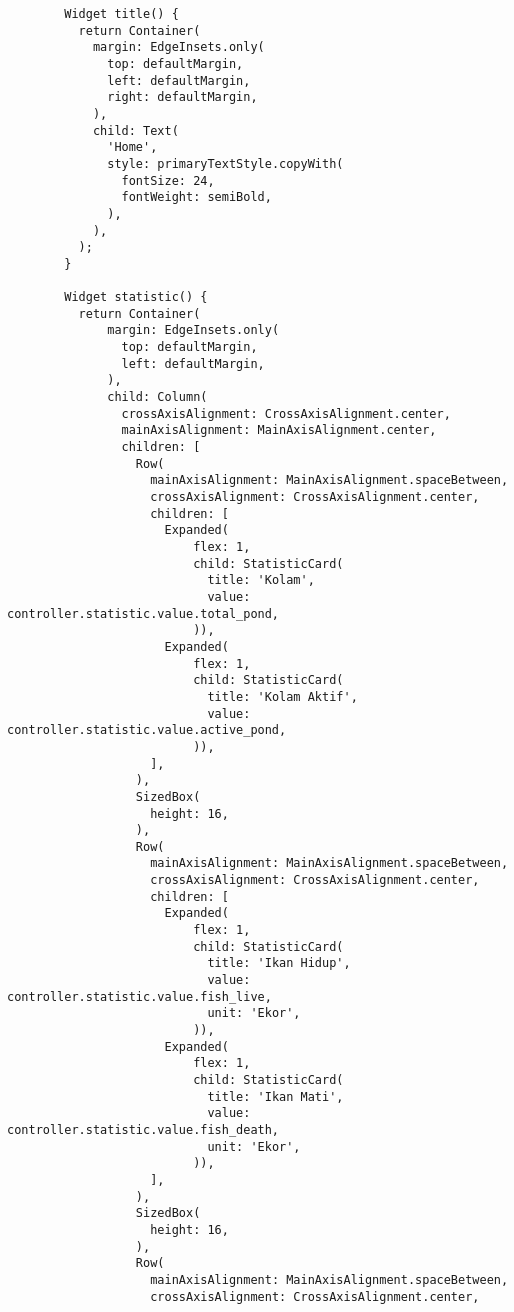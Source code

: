 	\begin{lstlisting}
	    Widget title() {
	      return Container(
	        margin: EdgeInsets.only(
	          top: defaultMargin,
	          left: defaultMargin,
	          right: defaultMargin,
	        ),
	        child: Text(
	          'Home',
	          style: primaryTextStyle.copyWith(
	            fontSize: 24,
	            fontWeight: semiBold,
	          ),
	        ),
	      );
	    }
	
	    Widget statistic() {
	      return Container(
	          margin: EdgeInsets.only(
	            top: defaultMargin,
	            left: defaultMargin,
	          ),
	          child: Column(
	            crossAxisAlignment: CrossAxisAlignment.center,
	            mainAxisAlignment: MainAxisAlignment.center,
	            children: [
	              Row(
	                mainAxisAlignment: MainAxisAlignment.spaceBetween,
	                crossAxisAlignment: CrossAxisAlignment.center,
	                children: [
	                  Expanded(
	                      flex: 1,
	                      child: StatisticCard(
	                        title: 'Kolam',
	                        value: controller.statistic.value.total_pond,
	                      )),
	                  Expanded(
	                      flex: 1,
	                      child: StatisticCard(
	                        title: 'Kolam Aktif',
	                        value: controller.statistic.value.active_pond,
	                      )),
	                ],
	              ),
	              SizedBox(
	                height: 16,
	              ),
	              Row(
	                mainAxisAlignment: MainAxisAlignment.spaceBetween,
	                crossAxisAlignment: CrossAxisAlignment.center,
	                children: [
	                  Expanded(
	                      flex: 1,
	                      child: StatisticCard(
	                        title: 'Ikan Hidup',
	                        value: controller.statistic.value.fish_live,
	                        unit: 'Ekor',
	                      )),
	                  Expanded(
	                      flex: 1,
	                      child: StatisticCard(
	                        title: 'Ikan Mati',
	                        value: controller.statistic.value.fish_death,
	                        unit: 'Ekor',
	                      )),
	                ],
	              ),
	              SizedBox(
	                height: 16,
	              ),
	              Row(
	                mainAxisAlignment: MainAxisAlignment.spaceBetween,
	                crossAxisAlignment: CrossAxisAlignment.center,

\end{lstlisting}
